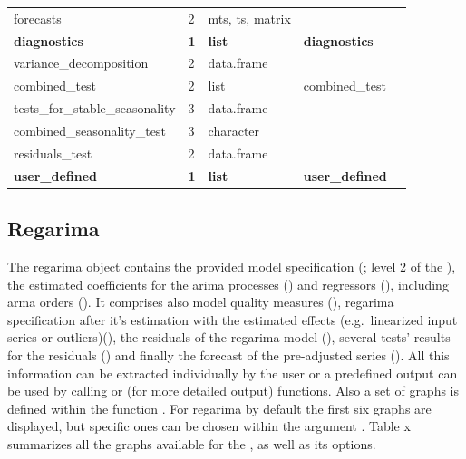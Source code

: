 \documentclass[article]{jss}
\begin{document}
\begin{longtable}[t]{lllll}
\hspace{2em}forecasts & 2 & mts, ts, matrix &  & \\
\textbf{\hspace{1em}diagnostics} & \textbf{1} & \textbf{list} & \textbf{diagnostics}\\
\addlinespace
\hspace{2em}variance\_decomposition & 2 & data.frame &  & \\
\hspace{2em}combined\_test & 2 & list & combined\_test & \\
\hspace{3em}tests\_for\_stable\_seasonality & 3 & data.frame &  & \\
\hspace{3em}combined\_seasonality\_test & 3 & character &  & \\
\hspace{2em}residuals\_test & 2 & data.frame &  & \\
\textbf{\hspace{1em}user\_defined} & \textbf{1} & \textbf{list} & \textbf{user\_defined}\\
\bottomrule
\end{longtable}\endgroup{}

\hypertarget{regarima}{%
\subsection{Regarima}\label{regarima}}

The regarima object contains the provided model specification
(; level 2 of the ), the estimated
coefficients for the arima processes () and
regressors (), including arma orders
(). It comprises also model quality measures (),
regarima specification after it's estimation with the estimated effects
(e.g.~linearized input series or outliers)(), the residuals
of the regarima model (), several tests' results for the
residuals () and finally the forecast of the
pre-adjusted series (). All this information can be
extracted individually by the user or a predefined output can be used by
calling  or  (for more detailed output)
functions. Also a set of graphs is defined within the function
. For regarima by default the first six graphs are
displayed, but specific ones can be chosen within the argument
. Table x summarizes all the graphs available for the
, as well as its  options.
\end{document}
